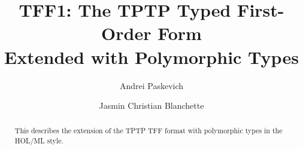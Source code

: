 \documentclass[draft,a4paper]{llncs}
\begin{document}
\title{
TFF1: The TPTP Typed First-Order Form \\ Extended with Polymorphic Types}

\author{
Andrei Paskevich \and Jasmin Christian Blanchette
}


\maketitle

\begin{abstract}
This \paper{} describes the extension of the TPTP TFF format with polymorphic
types in the HOL/ML style.
\end{abstract}











\end{document}
